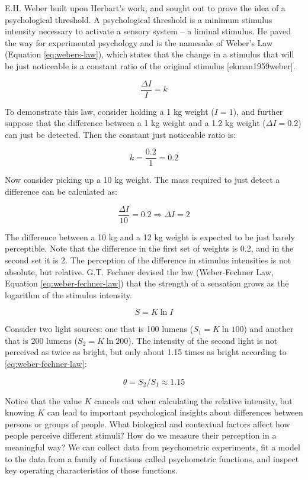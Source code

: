 \documentclass[11pt, oneside, openany]{scrbook}
\begin{document}
E.H. Weber built upon Herbart's work, and sought out to prove the idea of a psychological threshold. A psychological threshold is a minimum stimulus intensity necessary to activate a sensory system -- a liminal stimulus. He paved the way for experimental psychology and is the namesake of Weber's Law (Equation \eqref{eq:webers-law}), which states that the change in a stimulus that will be just noticeable is a constant ratio of the original stimulus {[}ekman1959weber{]}.

\begin{equation}
  \frac{\Delta I}{I} = k
  \label{eq:webers-law}
\end{equation}

To demonstrate this law, consider holding a 1 kg weight (\(I = 1\)), and further suppose that the difference between a 1 kg weight and a 1.2 kg weight (\(\Delta I = 0.2\)) can just be detected. Then the constant just noticeable ratio is:

\[k = \frac{0.2}{1} = 0.2\]

Now consider picking up a 10 kg weight. The mass required to just detect a difference can be calculated as:

\[\frac{\Delta I}{10} = 0.2 \Rightarrow \Delta I = 2\]

The difference between a 10 kg and a 12 kg weight is expected to be just barely perceptible. Note that the difference in the first set of weights is 0.2, and in the second set it is 2. The perception of the difference in stimulus intensities is not absolute, but relative. G.T. Fechner devised the law (Weber-Fechner Law, Equation \eqref{eq:weber-fechner-law}) that the strength of a sensation grows as the logarithm of the stimulus intensity.

\begin{equation}
  S = K \ln I
  \label{eq:weber-fechner-law}
\end{equation}

Consider two light sources: one that is 100 lumens (\(S_1 = K \ln 100\)) and another that is 200 lumens (\(S_2 = K \ln 200\)). The intensity of the second light is not perceived as twice as bright, but only about 1.15 times as bright according to \eqref{eq:weber-fechner-law}:

\[\theta = S_2 / S_1 \approx 1.15\]

Notice that the value \(K\) cancels out when calculating the relative intensity, but knowing \(K\) can lead to important psychological insights about differences between persons or groups of people. What biological and contextual factors affect how people perceive different stimuli? How do we measure their perception in a meaningful way? We can collect data from psychometric experiments, fit a model to the data from a family of functions called psychometric functions, and inspect key operating characteristics of those functions.
\end{document}

